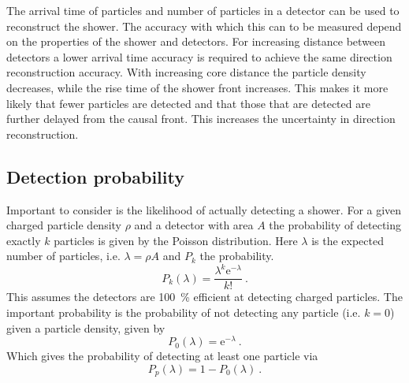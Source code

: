 The arrival time of particles and number of particles in a detector can be used to reconstruct the shower. The accuracy with which this can to be measured depend on the properties of the shower and detectors. For increasing distance between detectors a lower arrival time accuracy is required to achieve the same direction reconstruction accuracy. With increasing core distance the particle density decreases, while the rise time of the shower front increases. This makes it more likely that fewer particles are detected and that those that are detected are further delayed from the causal front. This increases the uncertainty in direction reconstruction.

\subsection{Detection probability}
\label{ssec:detection_probability}

Important to consider is the likelihood of actually detecting a shower. For a given charged particle density $\rho$ and a detector with area $A$ the probability of detecting exactly $k$ particles is given by the Poisson distribution. Here $\lambda$ is the expected number of particles, i.e. $\lambda = \rho A$ and $P_k$ the probability.
%
\begin{equation}
    \label{eq:poisson}
    P_k(\lambda) = \frac{\lambda^k \mathrm{e}^{-\lambda}}{k!} \ .
\end{equation}
%
This assumes the detectors are \SI{100}{\percent} efficient at detecting charged particles. The important probability is the probability of not detecting any particle (i.e. $k = 0$) given a particle density, given by
%
\begin{equation}
    P_0(\lambda) = \mathrm{e}^{-\lambda} \ .
\end{equation}
%
Which gives the probability of detecting at least one particle via
%
\begin{equation}
    P_p(\lambda) = 1-P_0(\lambda) \ .
\end{equation}

